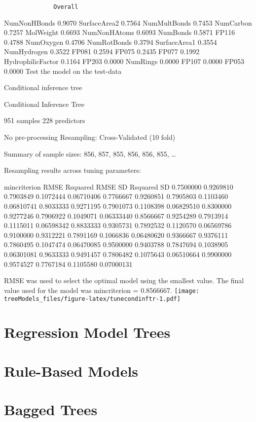 \documentclass[]{article}
\begin{document}
\begin{verbatim}
              Overall
\end{verbatim}

NumNonHBonds 0.9070 SurfaceArea2 0.7564 NumMultBonds 0.7453 NumCarbon
0.7257 MolWeight 0.6693 NumNonHAtoms 0.6093 NumBonds 0.5871 FP116 0.4788
NumOxygen 0.4706 NumRotBonds 0.3794 SurfaceArea1 0.3554 NumHydrogen
0.3522 FP081 0.2594 FP075 0.2435 FP077 0.1992 HydrophilicFactor 0.1164
FP203 0.0000 NumRings 0.0000 FP107 0.0000 FP053 0.0000 Test the model on
the test-data

Conditional inference tree

Conditional Inference Tree

951 samples 228 predictors

No pre-processing Resampling: Cross-Validated (10 fold)

Summary of sample sizes: 856, 857, 855, 856, 856, 855, \ldots{}

Resampling results across tuning parameters:

mincriterion RMSE Rsquared RMSE SD Rsquared SD 0.7500000 0.9269810
0.7903849 0.1072444 0.06710406 0.7766667 0.9260851 0.7905803 0.1103460
0.06810741 0.8033333 0.9271195 0.7901073 0.1108398 0.06829510 0.8300000
0.9277246 0.7906922 0.1049071 0.06333440 0.8566667 0.9254289 0.7913914
0.1115011 0.06598342 0.8833333 0.9305731 0.7892532 0.1120570 0.06569786
0.9100000 0.9312221 0.7891169 0.1066836 0.06480620 0.9366667 0.9376111
0.7860495 0.1047474 0.06470085 0.9500000 0.9403788 0.7847694 0.1038905
0.06301081 0.9633333 0.9491457 0.7806482 0.1075643 0.06510664 0.9900000
0.9574527 0.7767184 0.1105580 0.07000131

RMSE was used to select the optimal model using the smallest value. The
final value used for the model was mincriterion = 0.8566667.
\texttt{[image: treeModels\_files/figure-latex/tunecondinftr-1.pdf]}

\section{Regression Model Trees}\label{regression-model-trees}

\section{Rule-Based Models}\label{rule-based-models}

\section{Bagged Trees}\label{bagged-trees}
\end{document}
